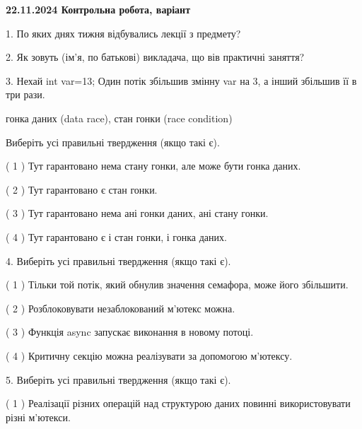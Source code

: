 \documentclass[12pt, ukrainian]{article}
\begin{document}
\vspace{4mm}
\newpage
\begin {large}

\textbf{22.11.2024 Контрольна робота, варіант  }\par


{
1. По яких днях тижня відбувались лекції з предмету?



\vspace{5mm}
2. Як зовуть (ім'я, по батькові) викладача, що вів практичні заняття?



\vspace{5mm}
3. Нехай int var=13; Один потік збільшив змінну var на 3, а інший збільшив її в три рази.

гонка даних (data race), стан гонки (race condition)

Виберіть усі правильні твердження (якщо такі є).\par
\vspace{2mm}
( 1 ) Тут гарантовано нема стану гонки, але може бути гонка даних.%

( 2 ) Тут гарантовано є стан гонки.%

( 3 ) Тут гарантовано нема ані гонки даних, ані стану гонки.%

( 4 ) Тут гарантовано є і стан гонки, і гонка даних.%


\vspace{5mm}
4. Виберіть усі правильні твердження (якщо такі є).\par
\vspace{2mm}

( 1 ) Тільки той потік, який обнулив значення семафора, може його збільшити.%

( 2 ) Розблоковувати незаблокований м’ютекс можна.%

( 3 ) Функція async запускає виконання в новому потоці.%

( 4 ) Критичну секцію можна реалізувати за допомогою м’ютексу.%


\vspace{5mm}
5. Виберіть усі правильні твердження (якщо такі є).\par
\vspace{2mm}

( 1 ) Реалізації різних операцій над структурою даних повинні використовувати різні м’ютекси.%

}
\end{large}
\end{document}
